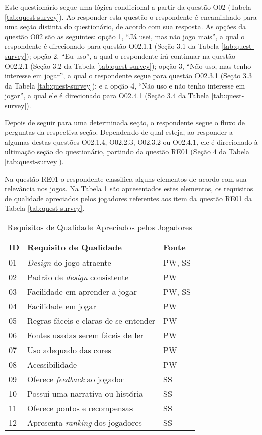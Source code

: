 \begin{apendicesenv}
Este questionário segue uma lógica condicional a partir da questão O02 (Tabela \ref{tab:quest-survey}). Ao responder esta questão o respondente é encaminhado para uma seção distinta do questionário, de acordo com sua resposta. As opções da questão O02 são as seguintes: opção 1, ``Já usei, mas não jogo mais”, a qual o respondente é direcionado para questão O02.1.1 (Seção 3.1 da Tabela \ref{tab:quest-survey}); opção 2, ``Eu uso”, a qual o respondente irá continuar na questão O02.2.1 (Seção 3.2 da Tabela \ref{tab:quest-survey}); opção 3, ``Não uso, mas tenho interesse em jogar”, a qual o respondente segue para questão O02.3.1 (Seção 3.3 da Tabela \ref{tab:quest-survey}); e a opção 4, ``Não uso e não tenho interesse em jogar”, a qual ele é direcionado para O02.4.1 (Seção 3.4 da Tabela \ref{tab:quest-survey}). 

Depois de seguir para uma determinada seção, o respondente segue o fluxo de perguntas da respectiva seção. Dependendo de qual esteja, ao responder a algumas destas questões O02.1.4, O02.2.3, O02.3.2 ou O02.4.1, ele é direcionado à ultimação seção do questionário, partindo da questão RE01 (Seção 4 da Tabela \ref{tab:quest-survey}).



Na questão RE01 o respondente classifica alguns elementos de acordo com sua relevância nos jogos. Na Tabela \ref{tab:req-qualit} são apresentados estes elementos, os requisitos de qualidade apreciados pelos jogadores referentes aos item da questão RE01 da Tabela \ref{tab:quest-survey}. 

\begin{table}[htbp]
\centering
\caption{Requisitos de Qualidade Apreciados pelos Jogadores}
\label{tab:req-qualit}
\begin{tabular}{|p{1cm}|p{9cm}|p{1.5cm}|}
\hline
\textbf{ID}& \textbf{Requisito de Qualidade} & Fonte \\ \hline
01             & \textit{Design} do jogo atraente & PW, SS\\ \hline
02             & Padrão de \textit{design} consistente & PW\\ \hline
03             & Facilidade em aprender a jogar & PW, SS  \\ \hline
04             & Facilidade em jogar & PW  \\ \hline
05             & Regras fáceis e claras de se entender & PW \\ \hline
06             & Fontes usadas serem fáceis de ler & PW \\ \hline
07             & Uso adequado das cores & PW \\ \hline
08             & Acessibilidade & PW \\ \hline
09             & Oferece \textit{feedback} ao jogador  & SS \\ \hline
10             & Possui uma narrativa ou história  &  SS \\ \hline
11             & Oferece pontos e recompensas  & SS \\ \hline
12             & Apresenta \textit{ranking} dos jogadores & SS \\ \hline


\end{tabular}
\end{table}
\end{apendicesenv}
